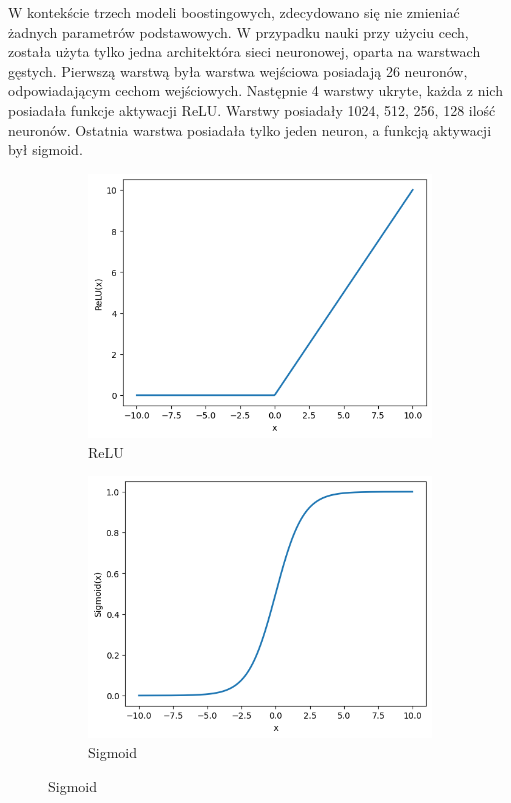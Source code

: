 \documentclass[a4paper,twoside,12pt]{book}
\begin{document}
W kontekście trzech modeli boostingowych, zdecydowano się nie zmieniać żadnych parametrów podstawowych.
\newpage
W przypadku nauki przy użyciu cech, została użyta tylko jedna architektóra sieci neuronowej, oparta na warstwach gęstych. Pierwszą warstwą była warstwa wejściowa posiadają 26 neuronów, odpowiadającym cechom wejściowych. Następnie 4 warstwy ukryte, każda z nich posiadała funkcje aktywacji ReLU. Warstwy posiadały 1024, 512, 256, 128 ilość neuronów. Ostatnia warstwa posiadała tylko jeden neuron, a funkcją aktywacji był sigmoid.
\begin{figure}[!htbp]
	\centering
	\caption{Wykresy wybranych funckji aktywacji}
	\begin{subfigure}[b]{0.45\textwidth}
		\centering
		\includegraphics[width=\linewidth]{img/r5/relu.png}
		\caption{ReLU}
		\label{fig:wykres2}
	\end{subfigure}
	\hfill
	\begin{subfigure}[b]{0.45\textwidth}
		\centering
		\includegraphics[width=\linewidth]{img/r5/sigmoid.png}
		\caption{Sigmoid}
		\label{Sigmoid}
	\end{subfigure}
\end{figure}
\end{document}
